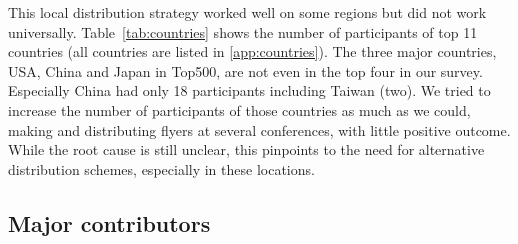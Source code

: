 \documentclass[preprint,5p,times]{elsarticle}
\newcommand{\revision}[2]{{\color{blue}#2}}
\def\Mcountries{Major contributors\xspace{}}%
\begin{document}
This local distribution strategy worked well on some regions but
did not work universally. Table~\ref{tab:countries} shows the number
of participants of top 11 countries (all countries are listed in
\ref{app:countries}).
\revision{Comparing with Table~\ref{tab:top500-share} listing the top 10
countries in the performance share in the Top500~\cite{Top500}, the}{The}
three major countries, USA, China and Japan in Top500, are not even in
the top \revision{5}{four} in our survey. Especially China \revision{has}{had} only 18 participants
including
Taiwan (\revision{2}{two}). We tried to increase the number of participants of those
countries as much as we could, making and distributing \revision{fliers}{flyers} at
several conferences, with little positive outcome. While the root cause is still unclear, this pinpoints to the need for alternative distribution schemes, especially in these locations.

\subsection*{\Mcountries}
\end{document}
